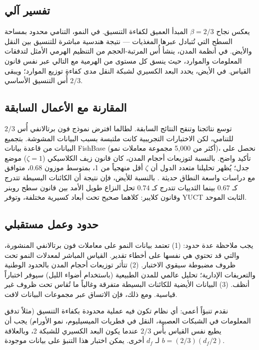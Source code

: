 \documentclass[11pt,a4paper]{article}
\newcommand{\df}{d_f}
\begin{document}
	\subsection{تفسير آلي}
	
	يعكس نجاح \(\beta = 2/3\) المبدأ العميق لكفاءة التنسيق. في النمو، التنامي محدود بمساحة السطح التي تُتبادل عبرها المغذيات — نتيجة هندسية مباشرة للتنسيق بين النقل والأيض. في أنظمة المدن، ينشأ أُس المرتبة-الحجم من التنظيم الهرمي الأمثل لتدفقات المعلومات والموارد، حيث ينسق كل مستوى من الهرمية مع التالي عبر نفس قانون القياس. في الأيض، يحدد البعد الكسيري لشبكة النقل مدى كفاءة توزيع الموارد؛ ويبقى أُس التنسيق الأساسي \(2/3\).
	
	\subsection{المقارنة مع الأعمال السابقة}
	
	توسع نتائجنا وتنقح النتائج السابقة. لطالما افترض نموذج فون برتالانفي أُس \(2/3\) للتنامي، لكن الاختبارات التجريبية كانت ملتبسة بسبب البيانات المشوشة. بتجميع البيانات من قاعدة بيانات FishBase (أكثر من 5,000 مجموعة معاملات نمو)، نحصل على تأكيد واضح. بالنسبة لتوزيعات أحجام المدن، كان قانون زيف الكلاسيكي (\(\zeta = 1\)) موضع جدل؛ يُظهر تحليلنا متعدد الدول أن \(\zeta\) أقل منهجياً من 1، بمتوسط موزون \(0.68\)، متوافق مع دراسات واسعة النطاق حديثة \cite{Gabaix2016}. بالنسبة للأيض، فإن نتيجة أن الكائنات البسيطة تتدرج كـ \(0.67\) بينما الثدييات تتدرج كـ \(0.74\) تحل النزاع طويل الأمد بين قانون سطح روبنر وقانون كلايبر: كلاهما صحيح تحت أبعاد كسيرية مختلفة، وتوفر YUCT الثابت الموحد.
	
	\subsection{حدود وعمل مستقبلي}
	
	يجب ملاحظة عدة حدود: (1) تعتمد بيانات النمو على معاملات فون برتالانفي المنشورة، والتي قد تحتوي هي نفسها على أخطاء تقدير. القياس المباشر لمعدلات النمو تحت ظروف مضبوطة سيقوي الاختبار. (2) تتأثر توزيعات أحجام المدن بالحدود الوطنية والتعريفات الإدارية؛ تحليل عالمي للمدن الطبيعية (باستخدام أضواء الليل) سيوفر اختباراً أنظف. (3) البيانات الأيضية للكائنات البسيطة متفرقة وغالباً ما تُقاس تحت ظروف غير قياسية. ومع ذلك، فإن الاتساق عبر مجموعات البيانات لافت.
	
	نقدم تنبؤاً أعمى: أي نظام تكون فيه عملية محدودة بكفاءة التنسيق (مثلاً تدفق المعلومات في الشبكات العصبية، النقل في فطريات الميسيليوم، نمو الأورام) يجب أن يطيع نفس القياس بأُس \(2/3\) عندما يكون البعد الكسيري للشبكة 2، وبالعلاقة \(b = (2/3)(\df/2)\) لـ \(\df\) أخرى. يمكن اختبار هذا التنبؤ على بيانات موجودة.
	
\end{document}
